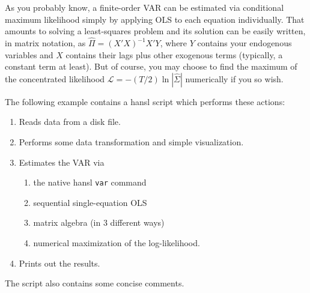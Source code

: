 \documentclass[oneside]{book}
\begin{document}
As you probably know, a finite-order VAR can be estimated via
conditional maximum likelihood simply by applying OLS to each equation
individually. That amounts to solving a least-squares problem and its
solution can be easily written, in matrix notation, as $\hat{\Pi} =
(X'X)^{-1} X'Y$, where $Y$ contains your endogenous variables and $X$
contains their lags plus other exogenous terms (typically, a constant
term at least). But of course, you may choose to find the maximum of
the concentrated likelihood $\mathcal{L} = -(T/2) \ln|\hat{\Sigma}|$
numerically if you so wish.

The following example contains a hansl script which performs these
actions:
\begin{enumerate}
\item Reads data from a disk file.
\item Performs some data transformation and simple visualization.
\item Estimates the VAR via 
  \begin{enumerate}
  \item the native hansl \texttt{var} command
  \item sequential single-equation OLS
  \item matrix algebra (in 3 different ways)
  \item numerical maximization of the log-likelihood.
  \end{enumerate}
\item Prints out the results.
\end{enumerate}
The script also contains some concise comments.
\end{document}
